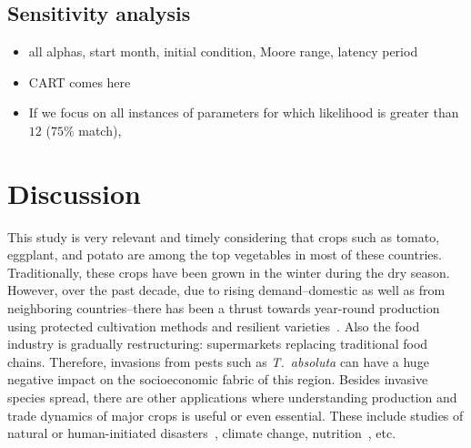 \documentclass[11pt]{article}
\newcommand{\tuta}{\emph{T.~absoluta}}
\theoremstyle{definition}
\begin{document}

\subsection{Sensitivity analysis}
\begin{itemize}
    \item all alphas, start month, initial condition, Moore range, latency
    period
\item CART comes here
\item If we focus on all
instances of parameters for which likelihood is greater than~$12$ ($75\%$
match),
\end{itemize}
\section{Discussion}
This study is very relevant and timely considering that crops such as
tomato, eggplant, and potato are among the top vegetables in most of these
countries.  Traditionally, these crops have been grown in the winter during
the dry season. However, over the past decade, due to rising
demand--domestic as well as from neighboring countries--there has been a
thrust towards year-round production using protected cultivation methods and
resilient varieties~\cite{ali2001,moustier2007}. Also the food industry is gradually
restructuring: supermarkets replacing traditional
food chains. Therefore, invasions from
pests such as \tuta{} can have a huge negative impact on the socioeconomic
fabric of this region. Besides invasive species spread, there are other
applications where understanding production and trade dynamics of major
crops is useful or even essential. These include studies of natural or
human-initiated disasters~\cite{}, climate change, nutrition~\cite{}, etc.
\end{document}
